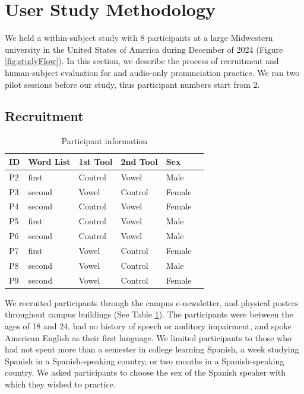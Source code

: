 \section{User Study Methodology}
We held a within-subject study with 8 participants at a large Midwestern university in the United States of America during December of 2024 (Figure \ref{fig:studyFlow}). In this section, we describe the process of recruitment and human-subject evaluation for \visowel{} and audio-only pronunciation practice. We ran two pilot sessions before our study, thus participant numbers start from 2.

\subsection{Recruitment}
\begin{table}[t]
    \centering
    \begin{tabular}{l|lllll|}
        ID  & Word List  & 1st Tool & 2nd Tool & Sex \\ \hline
        P2 & first & Control & Vowel & Male \\ 
        P3 & second & Vowel & Control & Female \\ 
        P4 & second & Control & Vowel & Female \\ 
        P5 & first & Control & Vowel & Male \\ 
        P6 & second & Control & Vowel & Male \\ 
        P7 & first & Vowel & Control & Female \\ 
        P8 & second & Vowel & Control & Male \\
        P9 & second & Vowel & Control & Female
    \end{tabular}
    \caption{Participant information}
    \label{tab:participants}
\end{table}

We recruited participants through the campus e-newsletter, and physical posters throughout campus buildings (See Table \ref{tab:participants}). The participants were between the ages of 18 and 24, had no history of speech or auditory impairment, and spoke American English as their first language. We limited participants to those who had not spent more than a semester in college learning Spanish, a week studying Spanish in a Spanish-speaking country, or two months in a Spanish-speaking country. We asked participants to choose the sex of the Spanish speaker with which they wished to practice.

